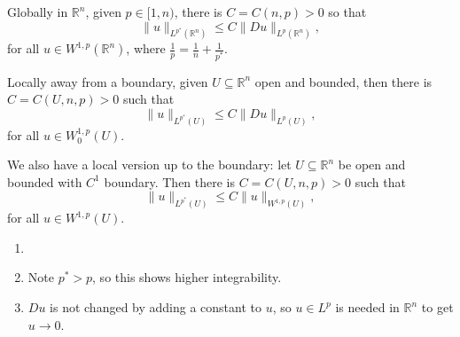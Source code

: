 \documentclass[12pt]{article}
\begin{document}
\begin{theorem}
	Globally in $\mathbb{R}^n$, given $p \in [1, n)$, there is $C = C(n, p) > 0$ so that
	\[
	\|u\|_{L^{p^{\ast}}(\mathbb{R}^n)} \leq C \|Du\|_{L^p(\mathbb{R}^n)},
	\]
	for all $u \in W^{1, p}(\mathbb{R}^n)$, where $\frac{1}{p} = \frac{1}{n} + \frac{1}{p^{\ast}}$.

	Locally away from a boundary, given $U \subseteq \mathbb{R}^n$ open and bounded, then there is $C = C(U, n, p) > 0$ such that
	\[
	\|u\|_{L^{p^\ast}(U)} \leq C \|Du\|_{L^p(U)},
	\]
	for all $u \in W^{1,p}_0(U)$.

	We also have a local version up to the boundary: let $U \subseteq \mathbb{R}^n$ be open and bounded with $C^1$ boundary. Then there is $C = C(U, n, p) > 0$ such that
	\[
	\|u\|_{L^{p^\ast}(U)} \leq C \|u\|_{W^{1, p}(U)},
	\]
	for all $u \in W^{1, p}(U)$.
\end{theorem}

\begin{remark}
	\begin{enumerate}
		\item[]
		\item Note $p^{\ast} > p$, so this shows higher integrability.
		\item $Du$ is not changed by adding a constant to $u$, so $u \in L^p$ is needed in $\mathbb{R}^n$ to get $u \to 0$.
	\end{enumerate}
\end{remark}
\end{document}
